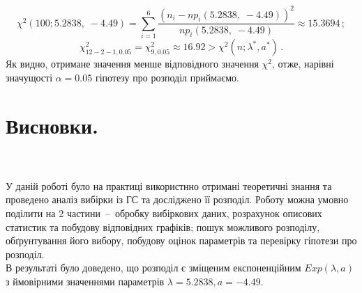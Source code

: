 \documentclass[14pt,a4paper]{scrartcl}
\begin{document}
%

$$\chi^2(100; 5.2838,\;-4.49)=
\sum\limits_{i = 1}^{6}{\frac{(n_i-np_i(5.2838,\;-4.49))^2}{np_i(5.2838,\;-4.49)}}\approx15.3694\,;$$
$$\chi^2_{12-2-1,0.05}=\chi^2_{9,0.05}\approx16.92>\chi^2(n;\lambda^*,a^*)\,.$$
Як видно, отримане значення менше відповідного значення $\chi^2$, отже, нарівні значущості $\alpha=0.05$ гіпотезу про розподіл приймаємо.\\
\section{Висновки.}\\\\

У даній роботі було на практиці використнно отримані теоретичні знання та проведено аналіз вибірки із ГС та досліджено її розподіл. Роботу можна умовно поділити на 2 частини~--~обробку вибіркових даних, розрахунок описових статистик та побудову відповідних графіків; пошук можливого розподілу, обґрунтування його вибору, побудову оцінок параметрів та перевірку гіпотези про розподіл.\\
В результаті було доведено, що розподіл є зміщеним експоненційним $Exp(\lambda,a)$ з ймовірними значеннями параметрів $\lambda=5.2838, a=-4.49$.
\end{document}
